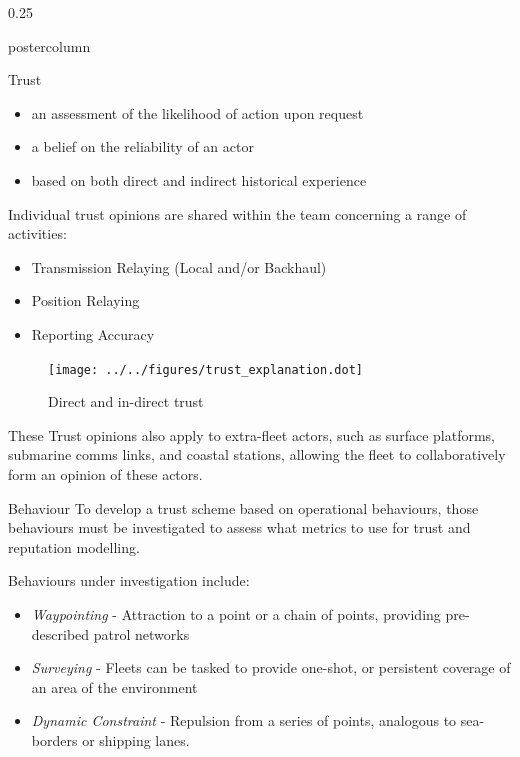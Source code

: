 \documentclass[final,hyperref={pdfpagelabels=false}]{beamer}
\def\colwidth{0.25\linewidth}
\begin{document}
\begin{frame}[fragile]
\begin{columns}[t]
\begin{column}{\colwidth}
\begin{beamercolorbox}[center,wd=\textwidth]{postercolumn}
\begin{minipage}[T]{.98\textwidth}
{\begin{block}{Trust}
\begin{itemize}
                    \item an assessment of the likelihood of action upon request
                    \item a belief on the reliability of an actor
                    \item based on both direct and indirect historical experience
                  \end{itemize}

                  Individual trust opinions are shared within the team concerning a range of activities:
                  \begin{itemize}
                    \item Transmission Relaying (Local and/or Backhaul)
                    \item Position Relaying
                    \item Reporting Accuracy
                  \end{itemize}

                  \begin{figure}
                    \begin{center}
                      \texttt{[image: ../../figures/trust\_explanation.dot]}
                    \end{center}
                    \vspace{-1ex}
                    \caption{Direct and in-direct trust}
                  \end{figure}
                  \vspace{-1ex}
                  These Trust opinions also apply to extra-fleet actors, such as surface platforms, submarine comms links, and coastal stations, allowing the fleet to collaboratively form an opinion of these actors.                  
            \end{block}
            \begin{block}{Behaviour}
              To develop a trust scheme based on operational behaviours, those behaviours must be investigated to assess what metrics to use for trust and reputation modelling. 

              \vspace{0.5\baselineskip}

              Behaviours under investigation include:
              \begin{itemize}
                \item \emph{Waypointing} - Attraction to a point or a chain of points, providing pre-described patrol networks
                \item \emph{Surveying} - Fleets can be tasked to provide one-shot, or persistent coverage of an area of the environment
                \item \emph{Dynamic Constraint} - Repulsion from a series of points, analogous to sea-borders or shipping lanes.
              \end{itemize}


\end{block}}
\end{minipage}
\end{beamercolorbox}
\end{column}
\end{columns}
\end{frame}
\end{document}
